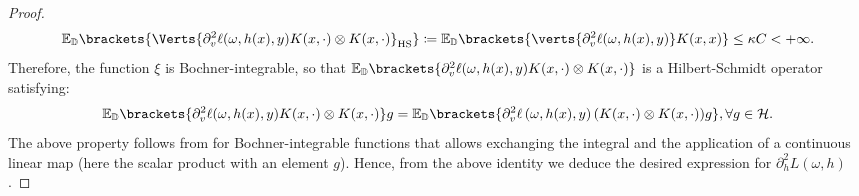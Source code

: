 \begin{proof}
	\begin{align*}
		\mathbb{E}_{\mathbb{\PP}}\brackets{ \Verts{\partial_{v}^2\ell(\omega,h(x),y)K(x,\cdot)\otimes K(x,\cdot)}_{\hs}}\coloneqq\mathbb{E}_{\mathbb{\PP}}\brackets{ \verts{\partial_{v}^2\ell(\omega,h(x),y)}K(x,x)}\leq \kappa C<+\infty.
	\end{align*}
	Therefore, the function $\xi$ is Bochner-integrable, so that $\mathbb{E}_{\mathbb{\PP}}\brackets{ \partial_{v}^2\ell(\omega,h(x),y)K(x,\cdot)\otimes K(x,\cdot)}$ is a Hilbert-Schmidt operator satisfying: 
\begin{align*}
	\mathbb{E}_{\mathbb{\PP}}\brackets{ \partial_{v}^2\ell(\omega,h(x),y)K(x,\cdot)\otimes K(x,\cdot)}  g=\mathbb{E}_{\PP}\brackets{\partial_{v}^2\ell\left(\omega,h(x),y\right)(K(x,\cdot)\otimes K(x,\cdot))g},\forall g\in \mathcal{H}.
\end{align*}
The above property follows from \citep[Theorem~6,~Chapter~2]{diestel1977vector} for Bochner-integrable functions that allows exchanging the integral and the application of a continuous linear map (here the scalar product with an element $g$). Hence, from the above identity we deduce the desired expression for $\partial_{h}^2 L(\omega,h)$. 
\end{proof}